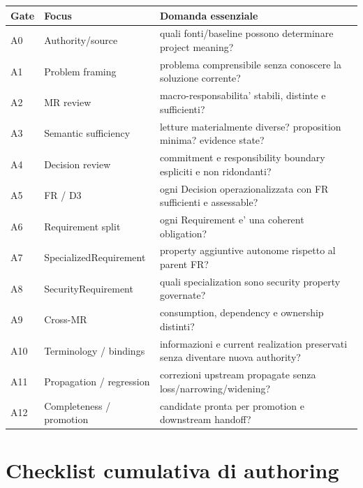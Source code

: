 \documentclass[11pt,a4paper]{article}
\begin{document}
\begin{longtable}{L{17mm}L{43mm}L{80mm}}
\toprule
\textbf{Gate} & \textbf{Focus} & \textbf{Domanda essenziale} \\
\midrule\endhead
A0 & Authority/source & quali fonti/baseline possono determinare project meaning? \\
A1 & Problem framing & problema comprensibile senza conoscere la soluzione corrente? \\
A2 & MR review & macro-responsabilita' stabili, distinte e sufficienti? \\
A3 & Semantic sufficiency & letture materialmente diverse? proposition minima? evidence state? \\
A4 & Decision review & commitment e responsibility boundary espliciti e non ridondanti? \\
A5 & FR / D3 & ogni Decision operazionalizzata con FR sufficienti e assessable? \\
A6 & Requirement split & ogni Requirement e' una coherent obligation? \\
A7 & SpecializedRequirement & property aggiuntive autonome rispetto al parent FR? \\
A8 & SecurityRequirement & quali specialization sono security property governate? \\
A9 & Cross-MR & consumption, dependency e ownership distinti? \\
A10 & Terminology / bindings & informazioni e current realization preservati senza diventare nuova authority? \\
A11 & Propagation / regression & correzioni upstream propagate senza loss/narrowing/widening? \\
A12 & Completeness / promotion & candidate pronta per promotion e downstream handoff? \\
\bottomrule
\end{longtable}

\section{Checklist cumulativa di authoring}
\end{document}

